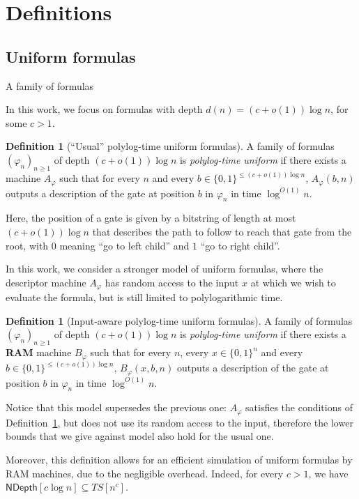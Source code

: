 \documentclass[a4paper, 11pt]{article}
\theoremstyle{plain}
\theoremstyle{definition}
\newtheorem{definition}[theorem]{Definition}
\theoremstyle{remark}
\newcommand{\bit}{\{0,1\}}%
\newcommand{\ND}{\textsf{NDepth}}%
\begin{document}
\section{Definitions}

\subsection{Uniform formulas}
A family of formulas

In this work, we focus on formulas with depth $d(n) = (c + o(1))\log n$, for some $c > 1$.

\begin{definition}[``Usual'' polylog-time uniform formulas]
	A family of formulas $(\varphi_n)_{n \ge 1}$ of depth $(c + o(1))\log n$ 
	is \textit{polylog-time uniform} if there exists a machine $A_\varphi$
	such that for every $n$ and every $b\in\bit^{\leq (c + o(1))\log n}$,
	$A_\varphi(b, n)$ outputs a description of the gate at position $b$ in $\varphi_n$ in time $\log^{O(1)} n$.
\end{definition}

Here, the position of a gate is given by a bitstring of length at most $(c + o(1))\log n$ 
that describes the path to follow to reach that gate from the root, 
with $0$ meaning ``go to left child'' and $1$ ``go to right child''.


In this work, we consider a stronger model of uniform formulas, 
where the descriptor machine $A_\varphi$ has random access to the input $x$ 
at which we wish to evaluate the formula, but is still limited to polylogarithmic time.
\begin{definition}[Input-aware polylog-time uniform formulas]\label{def:unif}
	A family of formulas $(\varphi_n)_{n \ge 1}$ of depth $(c + o(1))\log n$ is \textit{polylog-time uniform}
	if there exists a \textbf{RAM} machine $B_\varphi$
	such that for every $n$, every $x\in\bit^n$ and every 
	$b\in\bit^{\leq (c + o(1))\log n}$,
	$B_\varphi(x, b, n)$ outputs a description of the gate at position $b$ in $\varphi_n$ in time $\log^{O(1)} n$.
\end{definition}
Notice that this model supersedes the previous one: 
$A_\varphi$ satisfies the conditions of Definition~\ref{def:unif}, 
but does not use its random access to the input, 
therefore the lower bounds that we give against model also hold for the usual one.

Moreover, this definition allows for an efficient simulation of uniform formulas by RAM machines, 
due to the negligible overhead.
Indeed, for every $c > 1$, we have $\ND[c \log n] \subseteq TS[n^c]$.
\end{document}
